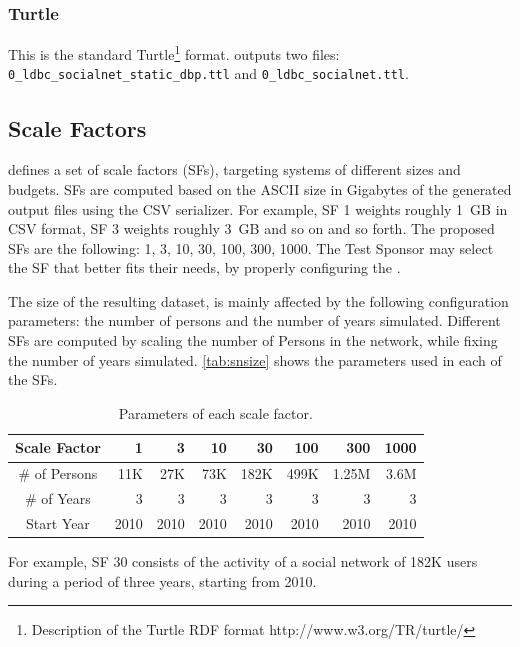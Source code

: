 \subsubsection{Turtle}

This is the standard Turtle\footnote{Description of
the Turtle RDF format http://www.w3.org/TR/turtle/} format. \datagen outputs
two files: \texttt{0\_ldbc\_socialnet\_static\_dbp.ttl} and \texttt{0\_ldbc\_socialnet.ttl}.

\subsection{Scale Factors}

\ldbcsnb defines a set of scale factors (SFs), targeting systems of different
sizes and budgets.  SFs are computed based on the ASCII size in Gigabytes of
the generated output files using the CSV serializer. For example, SF 1 weights roughly 1~GB in CSV
format, SF 3 weights roughly 3~GB and so on and so forth.  The proposed SFs are
the following: 1, 3, 10, 30, 100, 300, 1000. The Test Sponsor may select the SF
that better fits their needs, by properly configuring the \datagen.

The size of the resulting dataset, is mainly affected by the following
configuration parameters: the number of persons and the number of years
simulated. Different SFs are computed by scaling the number of Persons in
the network, while fixing the number of years simulated.
\autoref{tab:snsize} shows the parameters used in each of the SFs.

\begin{table}[H]
\centering
\begin{tabular}{|c||r|r|r|r|r|r|r|}
\hline  Scale Factor  & 1 &  3 & 10 & 30 & 100 & 300 & 1000 \\
\hline  \# of Persons  & 11K &  27K & 73K & 182K & 499K & 1.25M & 3.6M \\
\hline  \# of Years  & 3 &  3 & 3 & 3 & 3 & 3 & 3 \\
\hline  Start Year & 2010 &  2010 & 2010 & 2010 & 2010 & 2010 & 2010 \\
\hline
\end{tabular}
\centering
\caption{Parameters of each scale factor.}
\label{tab:snsize}
\end{table}

For example, SF 30 consists of the activity of a social network of 182K users
during a period of three years, starting from 2010.


